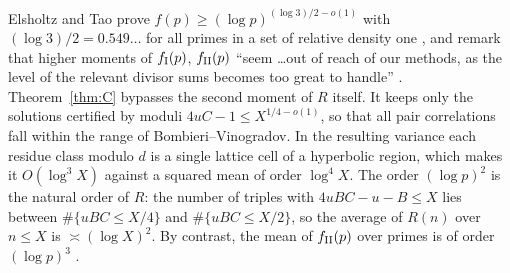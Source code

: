\documentclass[11pt,reqno]{amsart}
\theoremstyle{definition}
\begin{document}
Elsholtz and Tao prove $f(p)\ge(\log p)^{(\log3)/2-o(1)}$ with
$(\log 3)/2=0.549\ldots$ for all primes in a set of relative density one
\cite[Thm.~1.8]{ET}, and remark that higher moments of $f_{\rm I}(p)$,
$f_{\rm II}(p)$ ``seem \ldots out of reach of our methods, as the level
of the relevant divisor sums becomes too great to handle''
\cite[Rem.~1.3]{ET}.  Theorem~\ref{thm:C} bypasses the second moment of
$R$ itself.  It keeps only the solutions certified by moduli
$4uC-1\le X^{1/4-o(1)}$, so that all pair correlations fall within the
range of Bombieri--Vinogradov.  In the resulting variance each residue
class modulo $d$ is a single lattice cell of a hyperbolic region, which
makes it $O(\log^3 X)$ against a squared mean of order $\log^4X$.  The
order $(\log p)^2$ is the natural order of $R$: the number of triples
with $4uBC-u-B\le X$ lies between $\#\{uBC\le X/4\}$ and $\#\{uBC\le
X/2\}$, so the average of $R(n)$ over $n\le X$ is $\asymp(\log X)^2$.  By
contrast, the mean of $f_{\rm II}(p)$ over primes is of order $(\log p)^3$
\cite[Thm.~1.1]{ET}.
\end{document}
